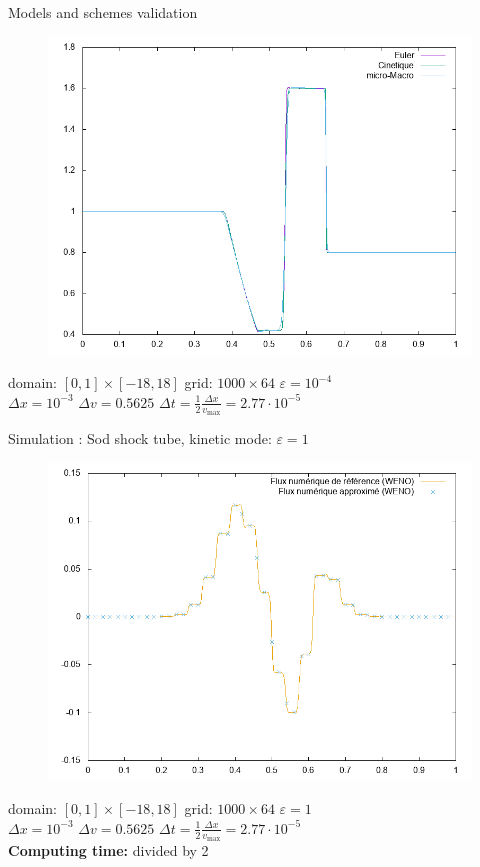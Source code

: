 \documentclass{beamer}
\begin{document}
\begin{frame}{Models and schemes validation}
{\begin{figure}
        \includegraphics[height=0.55\textheight]{img/neu_T.png}
      \end{figure}
    }
    domain: $[0,1]\times[-18,18]$ \hfill grid: $1000\times 64$ \hfill $\varepsilon = 10^{-4}$ \\
    $\Delta x = 10^{-3}$            \hfill $\Delta v = 0.5625$       \hfill $\Delta t = \frac{1}{2}\frac{\Delta x}{v_{\text{max}}} = 2.77\cdot 10^{-5}$
  \end{frame}
  \begin{frame}{Simulation : Sod shock tube, kinetic mode: $\varepsilon = 1$}
    \begin{figure}
      \includegraphics[height=0.55\textheight]{img/h/neuh_4_g.png}
    \end{figure}
    domain: $[0,1]\times[-18,18]$ \hfill grid: $1000\times 64$ \hfill $\varepsilon = 1$ \\
    $\Delta x = 10^{-3}$            \hfill $\Delta v = 0.5625$       \hfill $\Delta t = \frac{1}{2}\frac{\Delta x}{v_{\text{max}}} = 2.77\cdot 10^{-5}$ \\
    \textbf{Computing time:} divided by 2
  \end{frame}
\end{document}
